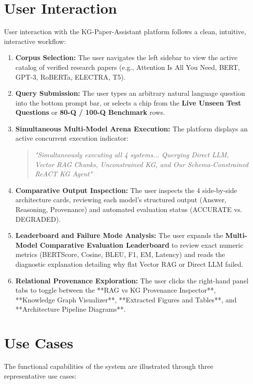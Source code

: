 \documentclass[12pt,a4paper,oneside]{report}
\begin{document}
\section{User Interaction}
User interaction with the KG-Paper-Assistant platform follows a clean, intuitive, interactive workflow:
\begin{enumerate}
    \item \textbf{Corpus Selection:} The user navigates the left sidebar to view the active catalog of verified research papers (e.g., Attention Is All You Need, BERT, GPT-3, RoBERTa, ELECTRA, T5).
    \item \textbf{Query Submission:} The user types an arbitrary natural language question into the bottom prompt bar, or selects a chip from the \textbf{Live Unseen Test Questions} or \textbf{80-Q / 100-Q Benchmark} rows.
    \item \textbf{Simultaneous Multi-Model Arena Execution:} The platform displays an active concurrent execution indicator:
    \begin{quote}
        \textit{"Simultaneously executing all 4 systems... Querying Direct LLM, Vector RAG Chunks, Unconstrained KG, and Our Schema-Constrained ReACT KG Agent"}
    \end{quote}
    \item \textbf{Comparative Output Inspection:} The user inspects the 4 side-by-side architecture cards, reviewing each model's structured output (Answer, Reasoning, Provenance) and automated evaluation status (ACCURATE vs. DEGRADED).
    \item \textbf{Leaderboard and Failure Mode Analysis:} The user expands the \textbf{Multi-Model Comparative Evaluation Leaderboard} to review exact numeric metrics (BERTScore, Cosine, BLEU, F1, EM, Latency) and reads the diagnostic explanation detailing why flat Vector RAG or Direct LLM failed.
    \item \textbf{Relational Provenance Exploration:} The user clicks the right-hand panel tabs to toggle between the **RAG vs KG Provenance Inspector**, **Knowledge Graph Visualizer**, **Extracted Figures and Tables**, and **Architecture Pipeline Diagrams**.
\end{enumerate}

\section{Use Cases}
The functional capabilities of the system are illustrated through three representative use cases:
\end{document}
